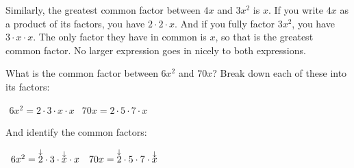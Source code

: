 \documentclass{ximera}
\begin{document}
Similarly, the greatest common factor between $4x$ and $3x^2$ is $x$.
      If you write $4x$ as a product of its factors,
      you have $2\cdot 2 \cdot x$.
      And if you fully factor $3x^2$,
      you have $3\cdot x\cdot x$.
      The only factor they have in common is $x$,
      so that is the greatest common factor.
      No larger expression goes in nicely to both expressions.
\begin{example}
   What is the common factor between $6x^2$ and $70x$?
        Break down each of these into its factors:
\begin{center}
$
\begin{array}{cc}
    6x^2  =2\cdot3\cdot x\cdot x & 70x  =2\cdot5\cdot7\cdot x
\end{array}
$
\end{center}
And identify the common factors:
\begin{center}
$
\begin{array}{cc}
 6x^2  =\mathord{\overset{\downarrow}{2}}\cdot3\cdot \mathord{\overset{\downarrow}{x}}\cdot x & 70x  =\mathord{\overset{\downarrow}{2}}\cdot5\cdot7\cdot \mathord{\overset{\downarrow}{x}}
\end{array}
$
\end{center}
\end{example}
\end{document}
